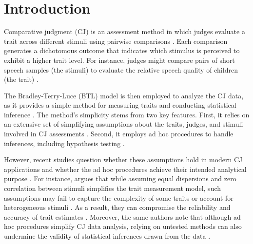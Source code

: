 \documentclass[
  authoryear,
  review,
  1p]{elsarticle}
\begin{document}
\newcommand{\dsep}{\:\bot\:}
\newcommand{\ndsep}{\:\not\bot\:}

\section{Introduction}\label{sec-introduction}

Comparative judgment (CJ) is an assessment method in which judges
evaluate a trait across different stimuli using pairwise comparisons
\citep{Thurstone_1927a, Thurstone_1927b}. Each comparison generates a
dichotomous outcome that indicates which stimulus is perceived to
exhibit a higher trait level. For instance, judges might compare pairs
of short speech samples (the stimuli) to evaluate the relative speech
quality of children (the trait) \citep{Boonen_et_al_2020}.

The Bradley-Terry-Luce (BTL) model \citep{Bradley_et_al_1952, Luce_1959}
is then employed to analyze the CJ data, as it provides a simple method
for measuring traits and conducting statistical inference
\citep{Andrich_1978, Pollitt_2012b}. The method's simplicity stems from
two key features. First, it relies on an extensive set of simplifying
assumptions about the traits, judges, and stimuli involved in CJ
assessments \citep{Thurstone_1927b, Bramley_2008}. Second, it employs ad
hoc procedures to handle inferences, including hypothesis testing
\citep{Pollitt_2012b}.

However, recent studies question whether these assumptions hold in
modern CJ applications
\citep{Bramley_2008, Kelly_et_al_2022, Rivera_et_al_2025} and whether
the ad hoc procedures achieve their intended analytical purpose
\citep{Kelly_et_al_2022, Rivera_et_al_2025}. For instance,
\citet[pp.~2]{Rivera_et_al_2025} argues that while assuming equal
dispersions and zero correlation between stimuli simplifies the trait
measurement model, such assumptions may fail to capture the complexity
of some traits or account for heterogeneous stimuli
\citep{Thurstone_1927a, Andrich_1978, vanDaal_et_al_2016, Lesterhuis_et_al_2018, Chambers_et_al_2022}.
As a result, they can compromise the reliability and accuracy of trait
estimates
\citep{Ackerman_1989, Zimmerman_1994, McElreath_2020, Wu_et_al_2022, Miller_2023, Hoyle_et_al_2023}.
Moreover, the same authors note that although ad hoc procedures simplify
CJ data analysis, relying on untested methods can also undermine the
validity of statistical inferences drawn from the data
\citep{McElreath_2020, Kline_et_al_2023, Hoyle_et_al_2023}.
\end{document}
